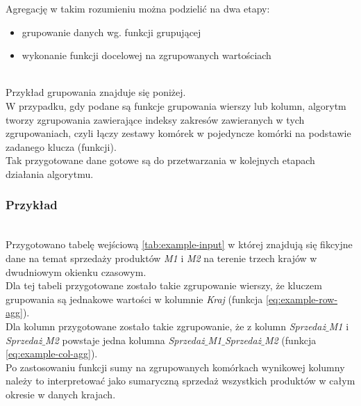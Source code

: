 \documentclass[brudnopis]{xmgr}
\begin{document}
Agregację w takim rozumieniu można podzielić na dwa etapy:
\begin{itemize}
    \item grupowanie danych wg. funkcji grupującej
    \item wykonanie funkcji docelowej na zgrupowanych wartościach
\end{itemize}
\medskip\\

Przykład grupowania znajduje się poniżej.
\medskip\\

W przypadku, gdy podane są funkcje grupowania wierszy lub kolumn, algorytm tworzy zgrupowania zawierające indeksy zakresów zawieranych w tych zgrupowaniach, czyli łączy zestawy komórek w pojedyncze komórki na podstawie zadanego klucza (funkcji).
\medskip\\

Tak przygotowane dane gotowe są do przetwarzania w kolejnych etapach działania algorytmu.

\newpage
\subsubsection{Przykład}
\medskip\\

Przygotowano tabelę wejściową \ref{tab:example-input} w której znajdują się fikcyjne dane na temat sprzedaży produktów \emph{M1} i \emph{M2} na terenie trzech krajów w dwudniowym okienku czasowym.
\medskip\\

Dla tej tabeli przygotowane zostało takie zgrupowanie wierszy, że kluczem grupowania są jednakowe wartości w kolumnie \emph{Kraj} (funkcja \ref{eq:example-row-agg}).
\medskip\\

Dla kolumn przygotowane zostało takie zgrupowanie, że z kolumn \emph{Sprzedaż$\_$M1} i \emph{Sprzedaż$\_$M2} powstaje jedna kolumna \emph{Sprzedaż$\_$M1$\_$Sprzedaż$\_$M2} (funkcja \ref{eq:example-col-agg}).
\medskip\\

Po zastosowaniu funkcji sumy na zgrupowanych komórkach wynikowej kolumny należy to interpretować jako sumaryczną sprzedaż wszystkich produktów w całym okresie w danych krajach.
\end{document}
